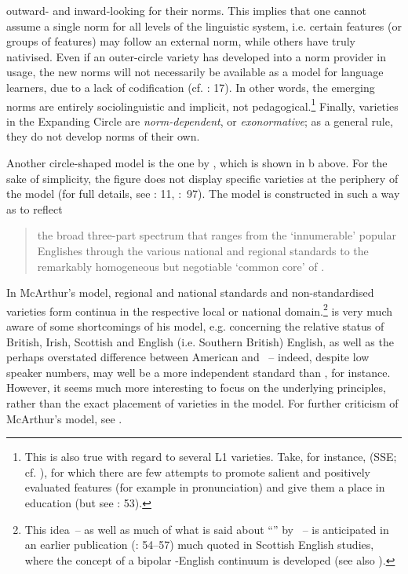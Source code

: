 outward- and inward-looking for their norms. This implies that one cannot assume a single norm for all levels of the linguistic system, i.e. certain features (or groups of features) may follow an external norm, while others have truly nativised. Even if an outer-circle variety has developed into a norm provider in usage, the new norms will not necessarily be available as a model for language learners, due to a lack of codification (cf. \citealt{Kachru1985}: 17). In other words, the emerging norms are entirely sociolinguistic and implicit, not pedagogical.\footnote{This is also true with regard to several L1 varieties. Take, for instance,  (SSE; cf. \citealt{Schützler2015}), for which there are few attempts to promote salient and positively evaluated features (for example in pronunciation) and give them a place in education (but see \citealt{Grant1914,Abercrombie1991}: 53).} Finally, varieties in the Expanding Circle are \textit{norm-dependent}, or \textit{exonormative}; as a general rule, they do not develop norms of their own.

Another circle-shaped model is the one by \citet[11]{McArthur1987}, which is shown in b above. For the sake of simplicity, the figure does not display specific varieties at the periphery of the model (for full details, see \citealt{McArthur1987}: 11, \citealt{McArthur1998}:~97). The model is constructed in such a way as to reflect

\begin{quote}
the broad three-part spectrum that ranges from the ‘innumerable’ popular Englishes through the various national and regional standards to the remarkably homogeneous but negotiable ‘common core’ of .
\end{quote}

In McArthur’s model, regional and national standards and non-standardised varieties form continua in the respective local or national domain.\footnote{This idea~– as well as much of what is said about “” by \citet{McArthur1987}~– is anticipated in an earlier publication (\citealt{McArthur1979}: 54–57) much quoted in Scottish English studies, where the concept of a bipolar -English continuum is developed (see also \citealt{Schützler2015,SchützlerGutFuchs2017}).} \citet[11]{McArthur1987} is very much aware of some shortcomings of his model, e.g. concerning the relative status of British, Irish, Scottish and English (i.e. Southern British) English, as well as the perhaps overstated difference between American and ~– indeed, despite low speaker numbers,  may well be a more independent standard than , for instance. However, it seems much more interesting to focus on the underlying principles, rather than the exact placement of varieties in the model. For further criticism of McArthur’s model, see \citet[27–28]{MesthrieBhatt2008}.

